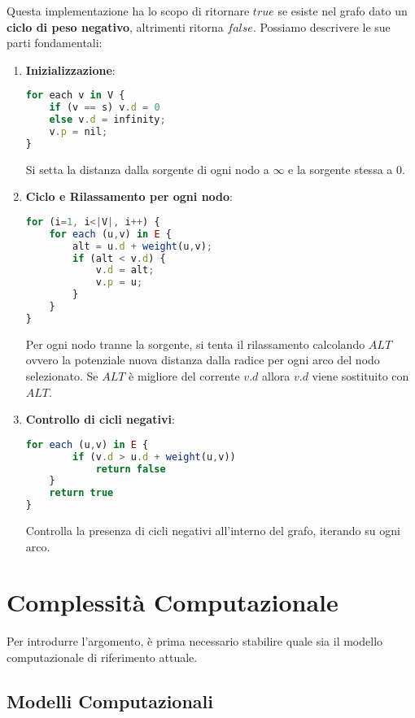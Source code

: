\documentclass{article}
\begin{document}
Questa implementazione ha lo scopo di ritornare $true$ se esiste nel grafo dato un \textbf{ciclo di peso negativo}, altrimenti ritorna $false$. Possiamo descrivere le sue parti fondamentali:

\vskip 2.5cm

\begin{enumerate}
    \item \textbf{Inizializzazione}: 
    \begin{lstlisting}[language=JavaScript]
for each v in V {
    if (v == s) v.d = 0
    else v.d = infinity;
    v.p = nil;
}
\end{lstlisting}
Si setta la distanza dalla sorgente di ogni nodo a $\infty$ e la sorgente stessa a 0.



\newpage
\vskip 2.5cm

\item \textbf{Ciclo e Rilassamento per ogni nodo}: 
    \begin{lstlisting}[language=JavaScript]
for (i=1, i<|V|, i++) {
    for each (u,v) in E {
        alt = u.d + weight(u,v);
        if (alt < v.d) {
            v.d = alt;
            v.p = u;
        }
    }
}
\end{lstlisting}
Per ogni nodo tranne la sorgente, si tenta il rilassamento calcolando $ALT$ ovvero la potenziale nuova distanza dalla radice per ogni arco del nodo selezionato. Se $ALT$ è migliore del corrente $v.d$ allora $v.d$ viene sostituito con $ALT$.
\vskip 2.5cm

\item \textbf{Controllo di cicli negativi}: 
\begin{lstlisting}[language=JavaScript]
for each (u,v) in E {
        if (v.d > u.d + weight(u,v)) 
            return false
    }
    return true
}
\end{lstlisting}
Controlla la presenza di cicli negativi all'interno del grafo, iterando su ogni arco.
\end{enumerate}

\newpage

\section{Complessità Computazionale}

Per introdurre l'argomento, è prima necessario stabilire quale sia il modello computazionale di riferimento attuale.

\subsection{Modelli Computazionali}
\end{document}
